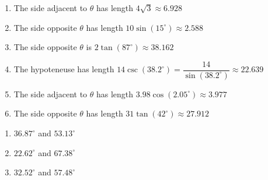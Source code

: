 \begin{enumerate}

\setcounter{enumi}{\value{HW}}

\item  The side adjacent to $\theta$ has length $4\sqrt{3} \approx 6.928$

\item  The side opposite $\theta$ has length $10 \sin(15^{\circ}) \approx 2.588$

\item  The side opposite $\theta$ is $2\tan(87^{\circ}) \approx 38.162$

\item  The hypoteneuse has length $14 \csc(38.2^{\circ}) = \dfrac{14}{\sin(38.2^{\circ})} \approx 22.639$

\item  The side adjacent to $\theta$ has length $3.98 \cos(2.05^{\circ}) \approx 3.977$

\item  The side opposite $\theta$ has length $31\tan(42^{\circ}) \approx 27.912$

\setcounter{HW}{\value{enumi}}

\end{enumerate}

\begin{multicols}{3}

\begin{enumerate}

\setcounter{enumi}{\value{HW}}

\item $36.87^{\circ}$ and $53.13^{\circ}$
\item $22.62^{\circ}$ and $67.38^{\circ}$
\item $32.52^{\circ}$ and $57.48^{\circ}$

\setcounter{HW}{\value{enumi}}

\end{enumerate}

\end{multicols}


